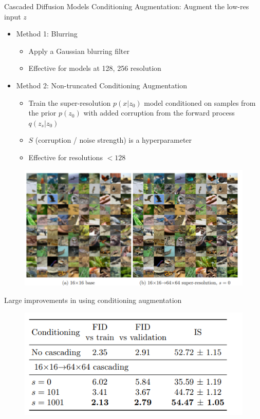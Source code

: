 \begin{frame}[allowframebreaks]{Cascaded Diffusion Models}
    Conditioning Augmentation: Augment the low-res input $z$
    \begin{itemize}
        \item Method 1: Blurring
        \begin{itemize}
            \item Apply a Gaussian blurring filter
            \item Effective for models at 128, 256 resolution
        \end{itemize}
        \item Method 2: Non-truncated Conditioning Augmentation
        \begin{itemize}
            \item Train the super-resolution $p(x|z_0)$ model conditioned on samples from the prior $p(z_0)$ with added corruption from the forward process $q(z_s|z_0)$
            \item $S$ (corruption / noise strength) is a hyperparameter
            \item Effective for resolutions $< 128$
        \end{itemize}
    \end{itemize}

    \framebreak
    \begin{figure}
        \centering
        \includegraphics[width=1.06\linewidth,height=0.95\textheight,keepaspectratio]{images/adv-img-gen/slide_105_1_img.png}
    \end{figure}

    \framebreak
    Large improvements in using conditioning augmentation

    \begin{figure}
        \centering
        \includegraphics[width=1.06\linewidth,height=0.65\textheight,keepaspectratio]{images/adv-img-gen/slide_106_1_img.png}
    \end{figure}
    
\end{frame}